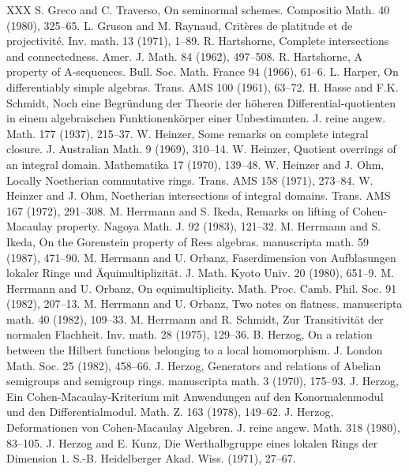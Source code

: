 \begin{thebibliography}{XXX}
 S. Greco and C. Traverso, On seminormal schemes. Compositio Math. 40 (1980), 325--65.
 L. Gruson and M. Raynaud, Crit\`eres de platitude et de projectivit\'e. Inv. math. 13 (1971), 1--89.
 R. Hartshorne, Complete intersections and connectedness. Amer. J. Math. 84 (1962), 497--508.
 R. Hartshorne, A property of A-sequences. Bull. Soc. Math. France 94 (1966), 61--6.
 L. Harper, On differentiably simple algebras. Trans. AMS 100 (1961), 63--72.
 H. Hasse and F.K. Schmidt, Noch eine Begr\"undung der Theorie der h\"oheren Differential-quotienten in einem algebraischen Funktionenk\"orper einer Unbestimmten. J. reine angew. Math. 177 (1937), 215--37.
 W. Heinzer, Some remarks on complete integral closure. J. Australian Math. 9 (1969), 310--14.
 W. Heinzer, Quotient overrings of an integral domain. Mathematika 17 (1970), 139--48.
 W. Heinzer and J. Ohm, Locally Noetherian commutative rings. Trans. AMS 158 (1971), 273--84.
 W. Heinzer and J. Ohm, Noetherian intersections of integral domains. Trans. AMS 167 (1972), 291--308.
 M. Herrmann and S. Ikeda, Remarks on lifting of Cohen-Macaulay property. Nagoya Math. J. 92 (1983), 121--32.
 M. Herrmann and S. Ikeda, On the Gorenstein property of Rees algebras. manuscripta math. 59 (1987), 471--90.
 M. Herrmann and U. Orbanz, Faserdimension von Aufblasungen lokaler Ringe und \"Aquimultiplizit\"at. J. Math. Kyoto Univ. 20 (1980), 651--9.
 M. Herrmann and U. Orbanz, On equimultiplicity. Math. Proc. Camb. Phil. Soc. 91 (1982), 207--13.
 M. Herrmann and U. Orbanz, Two notes on flatness. manuscripta math. 40 (1982), 109--33.
 M. Herrmann and R. Schmidt, Zur Transitivit\"at der normalen Flachheit. Inv. math. 28 (1975), 129--36.
 B. Herzog, On a relation between the Hilbert functions belonging to a local homomorphism. J. London Math. Soc. 25 (1982), 458--66.
 J. Herzog, Generators and relations of Abelian semigroups and semigroup rings. manuscripta math. 3 (1970), 175--93.
 J. Herzog, Ein Cohen-Macaulay-Kriterium mit Anwendungen auf den Konormalenmodul und den Differentialmodul. Math. Z. 163 (1978), 149--62.
 J. Herzog, Deformationen von Cohen-Macaulay Algebren. J. reine angew. Math. 318 (1980), 83--105.
 J. Herzog and E. Kunz, Die Werthalbgruppe eines lokalen Rings der Dimension 1. S.-B. Heidelberger Akad. Wiss. (1971), 27--67.

\end{thebibliography}
